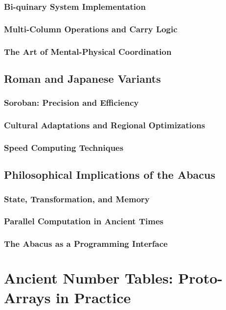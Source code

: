 \documentclass[12pt, oneside]{book}
\begin{document}
\subsubsection{Bi-quinary System Implementation}
\subsubsection{Multi-Column Operations and Carry Logic}
\subsubsection{The Art of Mental-Physical Coordination}

\subsection{Roman and Japanese Variants}
\subsubsection{Soroban: Precision and Efficiency}
\subsubsection{Cultural Adaptations and Regional Optimizations}
\subsubsection{Speed Computing Techniques}

\subsection{Philosophical Implications of the Abacus}
\subsubsection{State, Transformation, and Memory}
\subsubsection{Parallel Computation in Ancient Times}
\subsubsection{The Abacus as a Programming Interface}

\section{Ancient Number Tables: Proto-Arrays in Practice}
\end{document}
